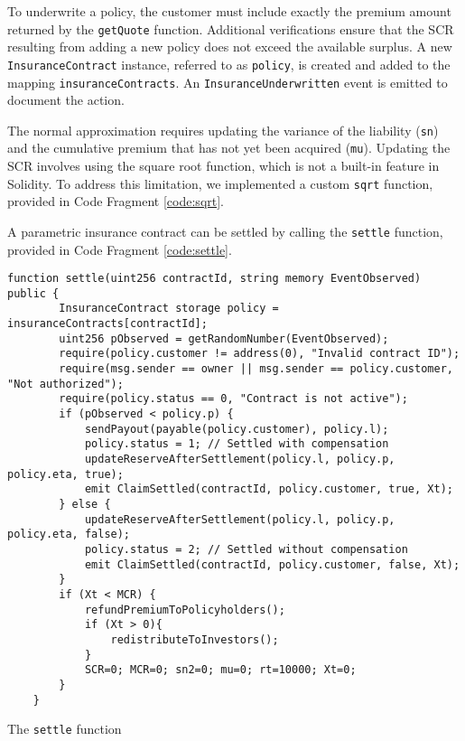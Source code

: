 \documentclass[10pt]{article}
\begin{document}
To underwrite a policy, the customer must include exactly the premium amount returned by the \texttt{getQuote} function. Additional verifications ensure that the SCR resulting from adding a new policy does not exceed the available surplus. A new \texttt{InsuranceContract} instance, referred to as \texttt{policy}, is created and added to the mapping \texttt{insuranceContracts}. An \texttt{InsuranceUnderwritten} event is emitted to document the action.

The normal approximation requires updating the variance of the liability (\texttt{sn}) and the cumulative premium that has not yet been acquired (\texttt{mu}). Updating the SCR involves using the square root function, which is not a built-in feature in Solidity. To address this limitation, we implemented a custom \texttt{sqrt} function, provided in Code Fragment \ref{code:sqrt}.

A parametric insurance contract can be settled by calling the \texttt{settle} function, provided in Code Fragment \ref{code:settle}.

\begin{codefragment}[!h]
\begin{lstlisting}[language=Solidity]
    function settle(uint256 contractId, string memory EventObserved) public {
        InsuranceContract storage policy = insuranceContracts[contractId];
        uint256 pObserved = getRandomNumber(EventObserved);
        require(policy.customer != address(0), "Invalid contract ID");
        require(msg.sender == owner || msg.sender == policy.customer, "Not authorized");
        require(policy.status == 0, "Contract is not active");
        if (pObserved < policy.p) {
            sendPayout(payable(policy.customer), policy.l);
            policy.status = 1; // Settled with compensation
            updateReserveAfterSettlement(policy.l, policy.p, policy.eta, true);
            emit ClaimSettled(contractId, policy.customer, true, Xt);
        } else {
            updateReserveAfterSettlement(policy.l, policy.p, policy.eta, false);
            policy.status = 2; // Settled without compensation
            emit ClaimSettled(contractId, policy.customer, false, Xt);
        }
        if (Xt < MCR) {
            refundPremiumToPolicyholders();
            if (Xt > 0){
                redistributeToInvestors();
            }
            SCR=0; MCR=0; sn2=0; mu=0; rt=10000; Xt=0;
        }
    }
\end{lstlisting}
    \caption{The \texttt{settle} function}
    \label{code:settle}
\end{codefragment}
\end{document}
